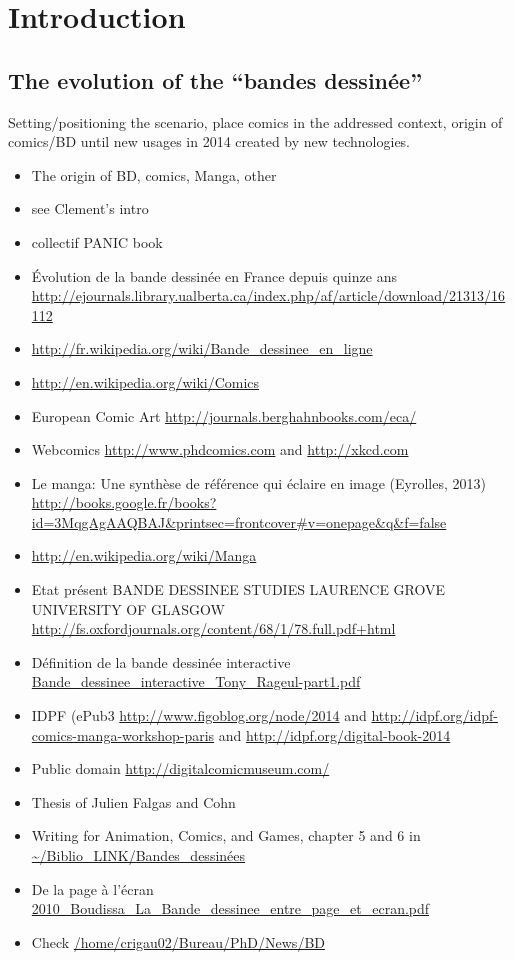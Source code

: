 \chapter{Introduction}%
\label{chap:intro}
\graphicspath{{./chapters/1-introduction/figs/}}
\section{The evolution of the ``bandes dessinée''}
Setting/positioning the scenario, place comics in the addressed context, origin of comics/BD until new usages in 2014 created by new technologies.
\cite[p.~215]{McCloud94}

\begin{itemize}
	\item The origin of BD, comics, Manga, other

	\item see Clement's intro
	\item collectif PANIC book
	\item Évolution de la bande dessinée en France depuis quinze ans \url{http://ejournals.library.ualberta.ca/index.php/af/article/download/21313/16112}
	\item \url{http://fr.wikipedia.org/wiki/Bande_dessinee_en_ligne}

	\item \url{http://en.wikipedia.org/wiki/Comics}
	\item European Comic Art \url{http://journals.berghahnbooks.com/eca/}
	\item Webcomics \url{http://www.phdcomics.com} and \url{http://xkcd.com}
	\item Le manga: Une synthèse de référence qui éclaire en image (Eyrolles, 2013) \url{http://books.google.fr/books?id=3MqgAgAAQBAJ&printsec=frontcover#v=onepage&q&f=false}
	\item \url{http://en.wikipedia.org/wiki/Manga}
	\item Etat présent BANDE DESSINEE STUDIES LAURENCE GROVE UNIVERSITY OF GLASGOW \url{http://fs.oxfordjournals.org/content/68/1/78.full.pdf+html}
	\item Définition de la bande dessinée interactive \url{Bande_dessinee_interactive_Tony_Rageul-part1.pdf}
	\item IDPF (ePub3 \url{http://www.figoblog.org/node/2014} and \url{http://idpf.org/idpf-comics-manga-workshop-paris} and \url{http://idpf.org/digital-book-2014}
	\item Public domain \url{http://digitalcomicmuseum.com/}
	\item Thesis of Julien Falgas and Cohn
	\item Writing for Animation, Comics, and Games, chapter 5 and 6 in \url{~/Biblio_LINK/Bandes_dessinées}
	\item De la page à l'écran \url{2010_Boudissa_La_Bande_dessinee_entre_page_et_ecran.pdf}
	\item Check \url{/home/crigau02/Bureau/PhD/News/BD}
	
\end{itemize}

